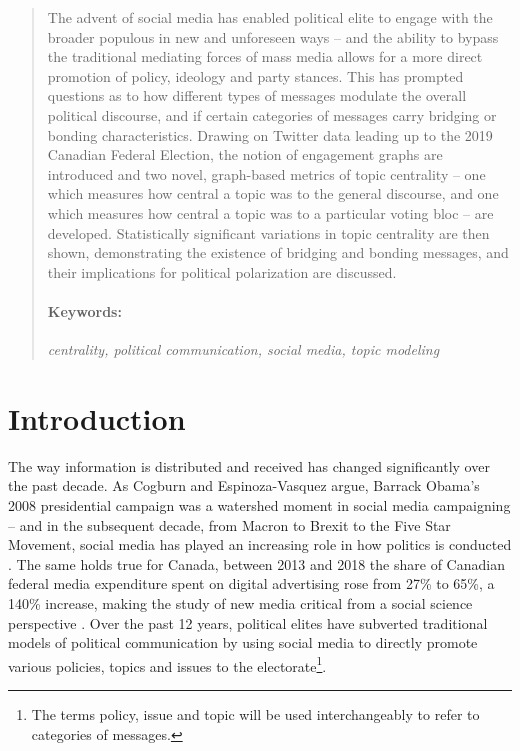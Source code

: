 \begin{abstract}
  The advent of social media has enabled political elite to engage with the
  broader populous in new and unforeseen ways -- and the ability to bypass the
  traditional mediating forces of mass media allows for a more direct promotion
  of policy, ideology and party stances. This has prompted questions as to how
  different types of messages modulate the overall political discourse, and if
  certain categories of messages carry bridging or bonding characteristics.
  Drawing on Twitter data leading up to the 2019 Canadian Federal Election, the
  notion of engagement graphs are introduced and two novel, graph-based metrics
  of topic centrality  -- one which measures how central a topic was to the
  general discourse, and one which measures how central a topic was to a
  particular voting bloc -- are developed. Statistically significant variations
  in topic centrality are then shown, demonstrating the existence of bridging
  and bonding messages, and their implications for political polarization are
  discussed.
  \paragraph{Keywords:} \emph{centrality, political communication, social media, topic modeling}
\end{abstract}

\tableofcontents

\section{Introduction}

The way information is distributed and received has changed significantly over
the past decade. As Cogburn and Espinoza-Vasquez argue, Barrack Obama’s 2008
presidential campaign was a watershed moment in social media campaigning – and
in the subsequent decade, from Macron to Brexit to the Five Star Movement,
social media has played an increasing role in how politics is conducted
\cite{manucci2018wind,cogburn2011networked}.  The same holds true for Canada,
between 2013 and 2018 the share of Canadian federal media expenditure spent on
digital advertising rose from 27\% to 65\%, a 140\% increase, making the study
of new media critical from a social science perspective
\cite{annualReportCanadaAdvertisingActivities_2018}. Over the past 12 years,
political elites have subverted traditional models of political communication by
using social media to directly promote various policies, topics and issues to
the electorate\footnote{The terms policy, issue and topic will be used
interchangeably to refer to categories of
messages.}\cite{mcnair2017introduction}.


